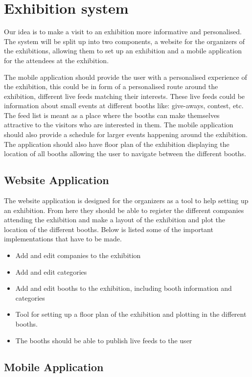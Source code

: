 \section{Exhibition system}\label{sec:exhibsystem}

Our idea is to make a visit to an exhibition more informative and personalised. The system will be split up into two components, a website for the organizers of the exhibitions, allowing them to set up an exhibition and a mobile application for the attendees at the exhibition.

The mobile application should provide the user with a personalised experience of the exhibition, this could be in form of a personalised route around the exhibition, different live feeds matching their interests. These live feeds could be information about small events at different booths like: give-aways, contest, etc. The feed list is meant as a place where the booths can make themselves attractive to the visitors who are interested in them. The mobile application should also provide a schedule for larger events happening around the exhibition. The application should also have floor plan of the exhibition displaying the location of all booths allowing the user to navigate between the different booths. 

\subsection*{Website Application}
The website application is designed for the organizers as a tool to help setting up an exhibition. From here they should be able to register the different companies attending the exhibition and make a layout of the exhibition and plot the location of the different booths. Below is listed some of the important implementations that have to be made.
\begin{itemize}
\item Add and edit companies to the exhibition
\item Add and edit categories
\item Add and edit booths to the exhibition, including booth information and categories
\item Tool for setting up a floor plan of the exhibition and plotting in the different booths.
\item The booths should be able to publish live feeds to the user
\end{itemize}
\subsection*{Mobile Application}

